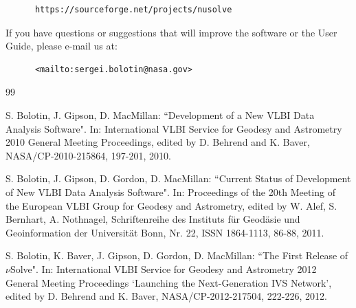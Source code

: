 \documentclass [10pt,letterpaper]{report}
\begin{document}
\begin{verbatim}
      https://sourceforge.net/projects/nusolve
\end{verbatim}

\noindent
If you have questions or suggestions that will improve the software or
the User Guide, please e-mail us at:

\begin{verbatim}
      <mailto:sergei.bolotin@nasa.gov>
\end{verbatim}



%
%
\begin{thebibliography}{99}

S. Bolotin, J. Gipson, D. MacMillan: ``Development of a New VLBI Data
Analysis Software". In: International VLBI Service for Geodesy and
Astrometry 2010 General Meeting Proceedings, edited by D. Behrend and K.
Baver, NASA/CP-2010-215864, 197-201, 2010.


S. Bolotin, J. Gipson, D. Gordon, D. MacMillan: ``Current Status of
Development of New VLBI Data Analysis Software". In: Proceedings of the
20th Meeting of the European VLBI Group for Geodesy and Astrometry,
edited by W. Alef, S. Bernhart, A. Nothnagel, Schriftenreihe des
Instituts f\"ur Geod\"asie und Geoinformation der Universit\"at Bonn,
Nr. 22, ISSN 1864-1113, 86-88, 2011.


S. Bolotin, K. Baver, J. Gipson, D. Gordon, D. MacMillan: ``The First
Release of $\nu$Solve". In: International VLBI Service for Geodesy and
Astrometry 2012 General Meeting Proceedings `Launching the
Next-Generation IVS Network', edited by D. Behrend and K. Baver,
NASA/CP-2012-217504, 222-226, 2012.


\end{thebibliography}
\end{document}
